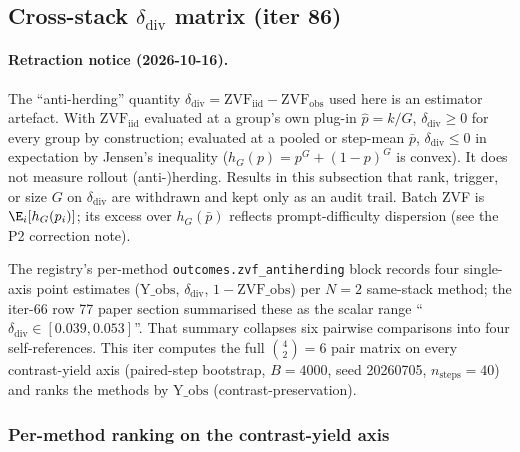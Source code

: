 \subsection{Cross-stack \texorpdfstring{$\delta_{\mathrm{div}}$}{delta-div} matrix (iter 86)}
\label{sec:p6-iter86-cross-stack-matrix}

\paragraph{Retraction notice (2026-10-16).} The ``anti-herding'' quantity
$\delta_{\mathrm{div}}=\mathrm{ZVF}_{\mathrm{iid}}-\mathrm{ZVF}_{\mathrm{obs}}$
used here is an estimator artefact. With $\mathrm{ZVF}_{\mathrm{iid}}$
evaluated at a group's own plug-in $\hat p=k/G$, $\delta_{\mathrm{div}}\ge0$
for every group by construction; evaluated at a pooled or step-mean $\bar p$,
$\delta_{\mathrm{div}}\le0$ in expectation by Jensen's inequality ($h_G(p)=p^G+(1-p)^G$
is convex). It does not measure rollout (anti-)herding. Results in this
subsection that rank, trigger, or size $G$ on $\delta_{\mathrm{div}}$ are
withdrawn and kept only as an audit trail. Batch ZVF is $\E_i[h_G(p_i)]$; its
excess over $h_G(\bar p)$ reflects prompt-difficulty dispersion (see the P2
correction note).


The registry's per-method \verb|outcomes.zvf_antiherding| block
records four single-axis point estimates
($\mathrm{Y\_obs}$, $\delta_{\mathrm{div}}$, $1-\mathrm{ZVF\_obs}$) per
$N\!=\!2$ same-stack method; the iter-66 row 77 paper section summarised
these as the scalar range ``$\delta_{\mathrm{div}} \in [0.039, 0.053]$''.
That summary collapses six pairwise comparisons into four self-references.
This iter computes the full $\binom{4}{2}=6$ pair matrix on every
contrast-yield axis (paired-step bootstrap, $B\!=\!4000$, seed
20260705, $n_{\mathrm{steps}}\!=\!40$) and ranks the methods by
$\mathrm{Y\_obs}$ (contrast-preservation).

\subsubsection{Per-method ranking on the contrast-yield axis}

